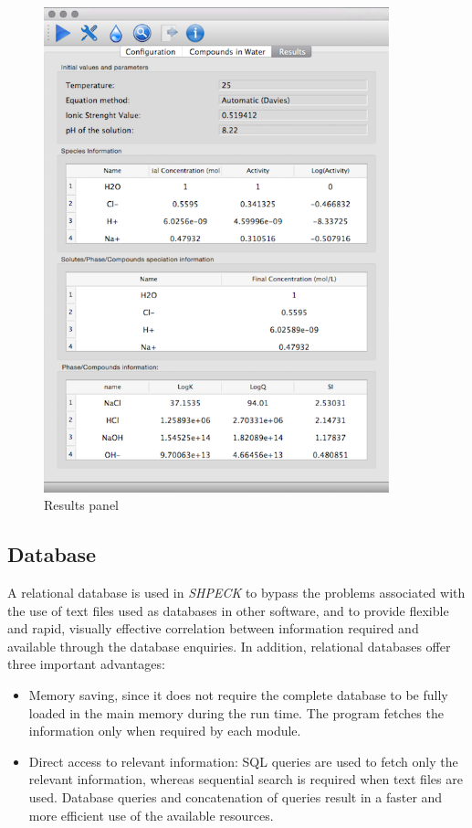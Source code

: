 \documentclass[preprint,12pt,3p]{elsarticle}
\begin{document}
\begin{figure}[ht!]
\centering
\includegraphics[width=100mm]{shpeck-resultstab.png}
\caption{Results panel}
\label{fig:output}
\end{figure}

\subsection{Database}
A relational database is used in \emph{SHPECK} to bypass the problems associated with the use of text files used as databases in other software, and to provide flexible and rapid, visually effective correlation between information required and available through the database enquiries. In addition, relational databases offer three important advantages:
\begin{itemize}
\item  Memory saving, since it does not require the complete database to be fully loaded in the main memory during the run time. The program fetches the information only when required by each module. 
\item Direct access to relevant information: SQL queries are used to fetch only the relevant information, whereas sequential search is required when text files are used. Database queries and concatenation of queries result in a faster and more efficient use of the available resources.
\end{itemize}
\end{document}
